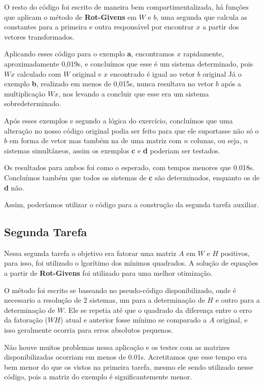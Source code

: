 \documentclass[a4paper, 12pt]{article}
\begin{document}
    O resto do código foi escrito de maneira bem compartimentalizada, há funções que aplicam o método de \textbf{Rot-Givens} em $W$ e $b$, uma segunda que calcula as constantes para a primeira e outra responsável por encontrar $x$ a partir dos vetores transformados.

    Aplicando esses código para o exemplo \textbf{a}, encontramos $x$ rapidamente, aproximadamente 0,019s, e concluímos que esse é um sistema determinado, pois $Wx$ calculado com  $W$ original e $x$ encontrado é igual ao vetor $b$ original
    Já o exemplo \textbf{b}, realizado em menos de 0,015s, nunca resultava no vetor $b$ após a multiplicação $Wx$, nos levando a concluir que esse era um sistema sobredeterminado.

    Após esses exemplos e segundo a lógica do exercício, concluímos que uma alteração no nosso código original podia ser feito para que ele suportasse não só o $b$ em forma de vetor mas também na de uma matriz com $n$ colunas, ou seja, $n$ sistemas simultâneos, assim os exemplos \textbf{c} e \textbf{d} poderiam ser testados.

    Os resultados para ambos foi como o esperado, com tempos menores que 0.018s.
    Concluímos também que todos os sistemas de  \textbf{c} são determinados, enquanto os de  \textbf{d} não.

    Assim, poderíamos utilizar o código para a construção da segunda tarefa auxiliar.

\subsection{Segunda Tarefa}

    Nessa segunda tarefa o objetivo era fatorar uma matriz $A$ em $W$ e  $H$ positivos, para isso, foi utilizado o lgorítimo dos mínimos quadrados.
    A solução de equações a partir de \textbf{Rot-Givens} foi utilizado para uma melhor otimização.

    O método foi escrito se baseando no pseudo-código disponibilizado, onde é necessario a resolução de 2 sistemas, um para a determinação de $H$ e outro para a determinação de $W$.
    Ele se repetia até que o quadrado da diferença entre o erro da fatoração ($WH$) atual e anterior fosse mínimo se comparado a $A$ original, e isso geralmente ocorria para erros absolutos pequenos.

    Não houve muitos problemas nessa aplicação e os testes com as matrizes disponibilizadas ocorriam em menos de 0.01s.
    Acretitamos que esse tempo era bem menor do que os vistos na primeira tarefa, mesmo ele sendo utilizado nesse código, pois a matriz do exemplo é significantemente menor.
\end{document}

